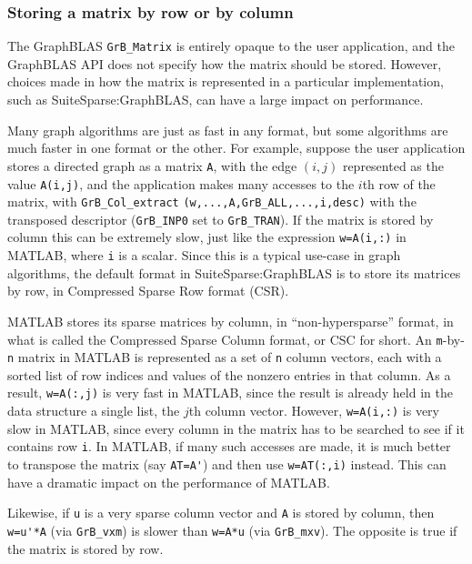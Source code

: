 \subsubsection{Storing a matrix by row or by column}
\label{storage_orientation}

The GraphBLAS \verb'GrB_Matrix' is entirely opaque to the user application, and
the GraphBLAS API does not specify how the matrix should be stored.  However,
choices made in how the matrix is represented in a particular implementation,
such as SuiteSparse:GraphBLAS, can have a large impact on performance.

Many graph algorithms are just as fast in any format, but some algorithms are
much faster in one format or the other.  For example, suppose the user
application stores a directed graph as a matrix \verb'A', with the edge $(i,j)$
represented as the value \verb'A(i,j)', and the application makes many accesses
to the $i$th row of the matrix, with \verb'GrB_Col_extract'
\verb'(w,...,A,GrB_ALL,...,i,desc)' with the transposed descriptor
(\verb'GrB_INP0' set to \verb'GrB_TRAN').  If the matrix is stored by column
this can be extremely slow, just like the expression \verb'w=A(i,:)' in MATLAB,
where \verb'i' is a scalar.  Since this is a typical use-case in graph
algorithms, the default format in SuiteSparse:GraphBLAS is to store its
matrices by row, in Compressed Sparse Row format (CSR).

MATLAB stores its sparse matrices by column, in ``non-hypersparse'' format, in
what is called the Compressed Sparse Column format, or CSC for short.  An
\verb'm'-by-\verb'n' matrix in MATLAB is represented as a set of \verb'n'
column vectors, each with a sorted list of row indices and values of the
nonzero entries in that column.  As a result, \verb'w=A(:,j)' is very fast in
MATLAB, since the result is already held in the data structure a single list,
the $j$th column vector.  However, \verb'w=A(i,:)' is very slow in MATLAB,
since every column in the matrix has to be searched to see if it contains row
\verb'i'.  In MATLAB, if many such accesses are made, it is much better to
transpose the matrix (say \verb"AT=A'") and then use \verb"w=AT(:,i)" instead.
This can have a dramatic impact on the performance of MATLAB.

Likewise, if \verb'u' is a very sparse column vector and \verb'A' is stored by
column, then \verb"w=u'*A" (via \verb'GrB_vxm') is slower than \verb'w=A*u'
(via \verb'GrB_mxv').  The opposite is true if the matrix is stored by row.

